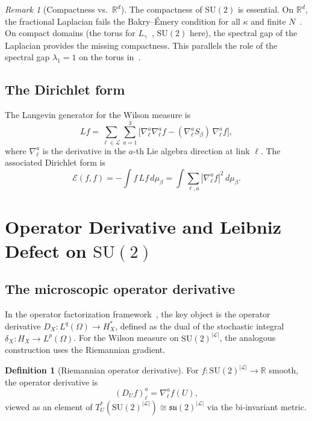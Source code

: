 \documentclass[11pt,a4paper]{article}
\theoremstyle{plain}
\theoremstyle{definition}
\newtheorem{definition}[theorem]{Definition}
\theoremstyle{remark}
\newtheorem{remark}[theorem]{Remark}
\newcommand{\R}{\mathbb{R}}
\newcommand{\SU}{\mathrm{SU}}
\newcommand{\su}{\mathfrak{su}}
\newcommand{\cE}{\mathcal{E}}
\newcommand{\cL}{\mathcal{L}}
\begin{document}
\begin{remark}[Compactness vs.\ $\R^d$]
The compactness of $\SU(2)$ is essential. On $\R^d$, the fractional
Laplacian fails the Bakry--\'Emery condition for all $\kappa$ and
finite $N$~\cite{SpenerWeberZacher2020}. On compact domains (the
torus for $L_\gamma$~\cite{Fontes2026f}, $\SU(2)$ here), the
spectral gap of the Laplacian provides the missing
compactness. This parallels the role of the spectral gap
$\lambda_1 = 1$ on the torus in~\cite{Fontes2026f}.
\end{remark}

\subsection{The Dirichlet form}

The Langevin generator for the Wilson measure is
\begin{equation}
Lf = \sum_{\ell \in \cL}\sum_{a=1}^3
\bigl[\nabla_\ell^a \nabla_\ell^a f
- (\nabla_\ell^a S_\beta)\,\nabla_\ell^a f\bigr],
\end{equation}
where $\nabla_\ell^a$ is the derivative in the $a$-th Lie algebra
direction at link $\ell$. The associated Dirichlet form is
\begin{equation}
\cE(f,f) = -\int f\,Lf\,d\mu_\beta
= \int \sum_{\ell,a} |\nabla_\ell^a f|^2\,d\mu_\beta.
\end{equation}


\section{Operator Derivative and Leibniz Defect on $\SU(2)$}\label{sec:operator}

\subsection{The microscopic operator derivative}

In the operator factorization framework~\cite{Fontes2026a}, the key
object is the operator derivative $D_X: L^q(\Omega) \to H_X^*$,
defined as the dual of the stochastic integral
$\delta_X: H_X \to L^p(\Omega)$. For the Wilson measure on
$\SU(2)^{|\cL|}$, the analogous construction uses the Riemannian
gradient.

\begin{definition}[Riemannian operator derivative]\label{def:DX}
For $f: \SU(2)^{|\cL|} \to \R$ smooth, the operator derivative is
\begin{equation}
(D_U f)_\ell^a = \nabla_\ell^a f(U),
\end{equation}
viewed as an element of
$T_U^*(\SU(2)^{|\cL|}) \cong \su(2)^{|\cL|}$ via the bi-invariant
metric.
\end{definition}
\end{document}

